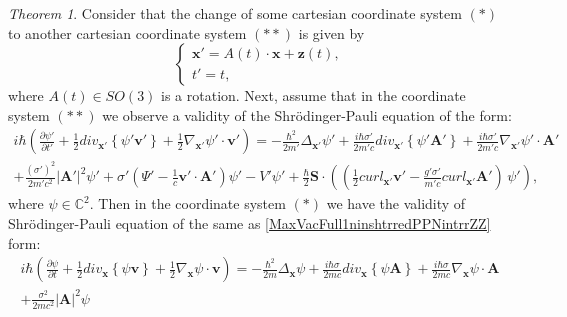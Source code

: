 \documentclass{article}
\newtheorem{theorem}{Theorem}[section]
\theoremstyle{definition}
\theoremstyle{remark}
\renewcommand{\vec}[1]{\mathbf{#1}}
\newcommand{\er}{\eqref}
\newcommand{\er}{\eqref}
\newtheorem{theorem}{Theorem}
\begin{document}
\begin{theorem}\label{gjghghgghgintintrrZZ}
Consider that the change of some cartesian coordinate system $(*)$
to another cartesian coordinate system $(**)$ is given by
\begin{equation}\label{noninchgravortbstrjgghguittu2intrrrZZ}
\begin{cases}
\vec x'=A(t)\cdot\vec x+\vec z(t),\\
t'=t,
\end{cases}
\end{equation}
where $A(t)\in SO(3)$ is a rotation. Next, assume that in the
coordinate system $(**)$ we observe a validity of the
Shr\"{o}dinger-Pauli equation of the form:
\begin{multline}\label{MaxVacFull1ninshtrredPPNintrrZZ}
i\hbar\left(\frac{\partial\psi'}{\partial t'}+\frac{1}{2}div_{\vec
x'}\left\{\psi'\vec v'\right\}+\frac{1}{2}\nabla_{\vec
x'}\psi'\cdot\vec v'\right)=-\frac{\hbar^2}{2m'}\Delta_{\vec
x'}\psi'+\frac{i\hbar\sigma'}{2m'c}div_{\vec x'}\left\{\psi'\vec
A'\right\}+\frac{i\hbar\sigma'}{2m'c}\nabla_{\vec x'}\psi'\cdot\vec
A'\\+\frac{(\sigma')^2}{2m'c^2}\left|\vec A'\right|^2\psi'
%
%
%
+\sigma'\left(\Psi'-\frac{1}{c}\vec v'\cdot\vec
A'\right)\psi'-V'\psi'+\frac{\hbar}{2}\vec
S\cdot\left(\left(\frac{1}{2}curl_{\vec x'}\vec
v'-\frac{g'\sigma'}{m'c}curl_{\vec x'}\vec A'\right)\,\psi'\right),
\end{multline}
where $\psi\in\mathbb{C}^2$. Then in the coordinate system $(*)$ we
have the validity of Shr\"{o}dinger-Pauli equation of the same as
\er{MaxVacFull1ninshtrredPPNintrrZZ} form:
\begin{multline}\label{MaxVacFull1ninshtrhjkkredPPNintrrZZ}
i\hbar\left(\frac{\partial\psi}{\partial t}+\frac{1}{2}div_{\vec
x}\left\{\psi\vec v\right\}+\frac{1}{2}\nabla_{\vec x}\psi\cdot\vec
v\right)=-\frac{\hbar^2}{2m}\Delta_{\vec
x}\psi+\frac{i\hbar\sigma}{2mc}div_{\vec x}\left\{\psi\vec
A\right\}+\frac{i\hbar\sigma}{2mc}\nabla_{\vec x}\psi\cdot\vec
A\\+\frac{\sigma^2}{2mc^2}\left|\vec A\right|^2\psi
%
%
%

\end{multline}
\end{theorem}
\end{document}
